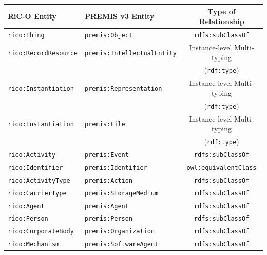 \documentclass[runningheads]{llncs}
\begin{document}
	\begin{table}[ht]
		\begin{center}
			\footnotesize
			\begin{tabular}{l  l  c}
				\hline\hline
				\textbf{RiC-O Entity} & \textbf{PREMIS v3 Entity} & \textbf{Type of Relationship} \\
				\hline\hline
				\texttt{rico:Thing} & 	\texttt{premis:Object} & 	\texttt{rdfs:subClassOf} \\\hline
				\texttt{rico:RecordResource} & \texttt{premis:IntellectualEntity} & Instance-level Multi-typing\\
				&  & (\texttt{rdf:type}) \\
				\hline
				\texttt{rico:Instantiation} & \texttt{premis:Representation} & Instance-level Multi-typing\\
				&  & (\texttt{rdf:type}) \\\hline
				\texttt{rico:Instantiation} & \texttt{premis:File} & Instance-level Multi-typing\\
				&  & (\texttt{rdf:type}) \\\hline
				\texttt{rico:Activity} & \texttt{premis:Event} & \texttt{rdfs:subClassOf} \\\hline
				\texttt{rico:Identifier} & \texttt{premis:Identifier} & \texttt{owl:equivalentClass} \\\hline
				\texttt{rico:ActivityType} & \texttt{premis:Action} & \texttt{rdfs:subClassOf} \\\hline
				\texttt{rico:CarrierType} & \texttt{premis:StorageMedium} & \texttt{rdfs:subClassOf} \\\hline
				\texttt{rico:Agent} & \texttt{premis:Agent} & \texttt{rdfs:subClassOf} \\\hline
				\texttt{rico:Person} & \texttt{premis:Person} & \texttt{rdfs:subClassOf} \\\hline
				\texttt{rico:CorporateBody} & \texttt{premis:Organization} & \texttt{rdfs:subClassOf} \\\hline
				\texttt{rico:Mechanism} & \texttt{premis:SoftwareAgent} & \texttt{rdfs:subClassOf} \\\hline

\end{tabular}
\end{center}
\end{table}
\end{document}
